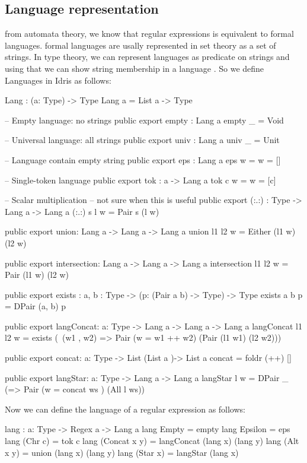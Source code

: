 \documentclass[]{rptuseminar}
\begin{document}
\subsection{Language representation}
from automata theory, we know that regular expressions is equivalent to formal languages. formal languages are usally represented in set theory as a set of strings. 
In type theory, we can represent languages as predicate on strings and using that we can show string membership in a language \cite{conal2021elliott}.
So we define Languages in Idris as follows:
\begin{idris}
 Lang : (a: Type) -> Type
Lang a = List a -> Type

-- Empty language: no strings
public export
empty : Lang a
empty _ = Void

-- Universal language: all strings
public export
univ : Lang a
univ _ = Unit 

-- Language contain empty string
public export
eps : Lang a
eps w = w = []

-- Single-token language
public export
tok : a -> Lang a
tok c w = w = [c]

-- Scalar multiplication
-- not sure when this is useful
public export
(:.:) : Type -> Lang a -> Lang a
(:.:) s l w = Pair s (l w)

public export
union: Lang a -> Lang a -> Lang a
union l1 l2 w = Either (l1 w) (l2 w)

public export
intersection: Lang a -> Lang a -> Lang a
intersection l1 l2 w = Pair (l1 w) (l2 w)

public export
exists : {a, b : Type} -> (p: (Pair a b) -> Type) -> Type 
exists {a} {b} p =  DPair (a, b) p 

public export
langConcat: {a: Type} -> Lang a -> Lang a -> Lang a  
langConcat l1 l2 w = 
  exists (\ (w1 , w2) => Pair (w = w1 ++ w2) (Pair (l1 w1) (l2 w2)))

public export
concat: {a: Type} -> List (List a )-> List a
concat = foldr (++) []

public export
langStar: {a: Type} -> Lang a -> Lang a
langStar l w  = DPair _ (\ws => Pair (w = concat ws ) (All l ws))
\end{idris}
Now we can define the language of a regular expression as follows:
\begin{idris}
lang : {a: Type } -> Regex a -> Lang a
lang Empty = empty
lang Epsilon = eps
lang (Chr c) = tok c
lang (Concat x y) = langConcat (lang x) (lang y)
lang (Alt x y) = union (lang x) (lang y)
lang (Star x) = langStar (lang x)
\end{idris}
\end{document}
